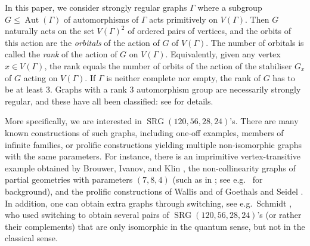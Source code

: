 \documentclass[a4paper]{article}
\theoremstyle{definition}
\renewcommand{\leq}{\leqslant}
\DeclareMathOperator{\SRG}{SRG}
\DeclareMathOperator{\Aut}{Aut}
\begin{document}
In this paper, we consider strongly regular graphs $\Gamma$ where a subgroup $G \leq \Aut(\Gamma)$ of automorphisms of $\Gamma$ acts primitively on $V(\Gamma)$.  Then $G$ naturally acts on the set $V(\Gamma)^2$ of ordered pairs of vertices, and the orbits of this action are the \emph{orbitals} of the action of $G$ of $V(\Gamma)$.
The number of orbitals is called the \emph{rank} of the action of $G$ on $V(\Gamma)$.
Equivalently, given any vertex $x \in V(\Gamma)$, the rank equals the number of orbits of the action of the stabiliser $G_x$ of $G$ acting on $V(\Gamma)$.
If $\Gamma$ is neither complete nor empty, the rank of $G$ has to be at least 3.
Graphs with a rank 3 automorphism group are necessarily strongly regular, and these have all been classified: see \cite{Brouwer:VanMaldeghem} for details.

More specifically, we are interested in $\SRG(120,56,28,24)$'s.  There are many known constructions of such graphs, including one-off examples, members of infinite families, or prolific constructions yielding multiple non-isomorphic graphs with the same parameters.  For instance, there is an imprimitive vertex-transitive example obtained by Brouwer, Ivanov, and Klin \cite{Klin}, the non-collinearity graphs of partial geometries with parameters $(7,8,4)$ (such as in \cite{Cohen}; see e.g.\ \cite[\S 8.6]{Brouwer:VanMaldeghem} for background), and the prolific constructions of Wallis \cite{Wallis} and of Goethals and Seidel \cite{Goethals:Seidel}.
In addition, one can obtain extra graphs through switching, see e.g.\ Schmidt \cite{Schmidt}, who used switching to obtain several pairs of $\SRG(120,56,28,24)$'s (or rather their complements) that are only isomorphic in the quantum sense, but not in the classical sense.
\end{document}
